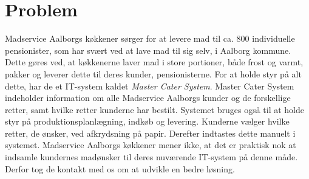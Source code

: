 \chapter{Problem}
Madservice Aalborgs køkkener sørger for at levere mad til ca. 800 individuelle pensionister, som har svært ved at lave mad til sig selv, i Aalborg kommune.
Dette gøres ved, at køkkenerne laver mad i store portioner, både frost og varmt, pakker og leverer dette til deres kunder, pensionisterne.
For at holde styr på alt dette, har de et IT-system kaldet \textit{Master Cater System}.
Master Cater System indeholder information om alle Madservice Aalborgs kunder og de forskellige retter, samt hvilke retter kunderne har bestilt.
Systemet bruges også til at holde styr på produktionsplanlægning, indkøb og levering.
Kunderne vælger hvilke retter, de ønsker, ved afkrydsning på papir.
Derefter indtastes dette manuelt i systemet.
Madservice Aalborgs køkkener mener ikke, at det er praktisk nok at indsamle kundernes madønsker til deres nuværende IT-system på denne måde.
Derfor tog de kontakt med os om at udvikle en bedre løsning.




